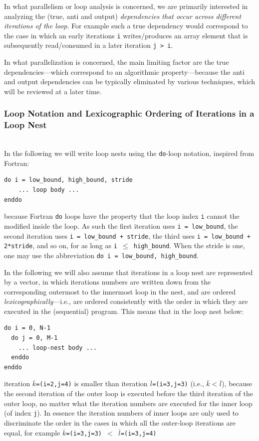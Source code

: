 \documentclass[acmsmall,review]{acmart}\settopmatter{printfolios=true,printccs=false,printacmref=false}
\begin{document}
In what parallelism or loop analysis is concerned, we are primarily
interested in analyzing the (true, anti and output) \emph{dependencies 
that occur across different iterations of the loop}. For example such
a true dependency would correspond to the case in which an early
iterations {\tt i} writes/produces an array element that is 
subsequently read/consumed in a later iteration {\tt j > i}.

In what parallelization is concerned, the main limiting factor 
are the true dependencies---which correspond to an algorithmic 
property---because the anti and output dependencies can be 
typically eliminated by various techniques, which will be
reviewed at a later time. 

\subsubsection{Loop Notation and Lexicographic Ordering of Iterations in a Loop Nest}
$\mbox{ }$\\

In the following we will write loop nests using the \lstinline{do}-loop
notation, inspired from Fortran:
\begin{lstlisting}[mathescape=true]
do i = low_bound, high_bound, stride
    ... loop body ...
enddo
\end{lstlisting}\vspace{-2ex}
because Fortran \lstinline{do} loops have the property that 
the loop index {\tt i} cannot the modified inside the loop. As
such the first iteration uses {\tt i = low\_bound}, the second
iteration uses {\tt i = low\_bound + stride}, the third uses
{\tt i = low\_bound + 2*stride}, and so on, for as long as 
{\tt i $\leq$ high\_bound}. When the stride is one, one may
use the abbreviation \lstinline{do i = low_bound, high_bound}.

In the following we will also assume that iterations in a loop 
nest are represented by a vector, in which iterations numbers 
are written down from the corresponding outermost to the innermost
loop in the nest, and are ordered \emph{lexicographically}---i.e., 
are ordered consistently with the order in which they are executed 
in the (sequential) program. This means that in the loop nest below:
\begin{lstlisting}[mathescape=true]
do i = 0, N-1
  do j = 0, M-1
    ... loop-nest body ...
  enddo
enddo
\end{lstlisting}\vspace{-2ex}
iteration {\tt$\overline{k}$=(i=2,j=4)} is smaller than iteration 
{\tt$\overline{l}$=(i=3,j=3)} (i.e., $\overline{k} < \overline{l}$),
because the second iteration of the outer loop is executed before
the third iteration of the outer loop, no matter what the iteration
numbers are executed for the inner loop (of index {\tt j}). 
In essence the iteration numbers of inner loops are only used to 
discriminate the order in the cases in which all the outer-loop
iterations are equal, for example 
{\tt$\overline{k}$=(i=3,j=3) $<$ $\overline{l}$=(i=3,j=4)}
\newpage
\end{document}
